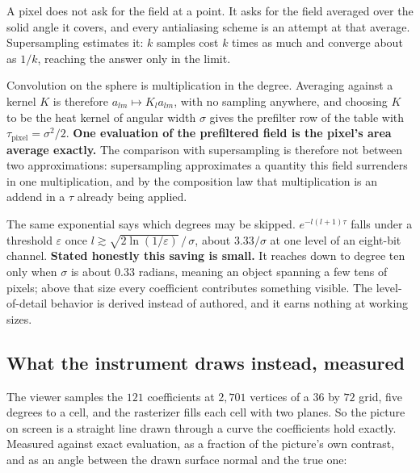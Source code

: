 A pixel does not ask for the field at a point. It asks for the field averaged over the solid angle it covers, and every antialiasing scheme is an attempt at that average. Supersampling estimates it: \(k\) samples cost \(k\) times as much and converge about as \(1/k\), reaching the answer only in the limit.

Convolution on the sphere is multiplication in the degree. Averaging against a kernel \(K\) is therefore \(a_{lm} \mapsto K_l a_{lm}\), with no sampling anywhere, and choosing \(K\) to be the heat kernel of angular width \(\sigma\) gives the prefilter row of the table with \(\tau_{\mathrm{pixel}} = \sigma^2/2\). \textbf{One evaluation of the prefiltered field is the pixel's area average exactly.} The comparison with supersampling is therefore not between two approximations: supersampling approximates a quantity this field surrenders in one multiplication, and by the composition law that multiplication is an addend in a \(\tau\) already being applied.

The same exponential says which degrees may be skipped. \(e^{-l(l+1)\tau}\) falls under a threshold \(\varepsilon\) once \(l \gtrsim \sqrt{2\ln(1/\varepsilon)}\,/\,\sigma\), about \(3.33/\sigma\) at one level of an eight-bit channel. \textbf{Stated honestly this saving is small.} It reaches down to degree ten only when \(\sigma\) is about \(0.33\) radians, meaning an object spanning a few tens of pixels; above that size every coefficient contributes something visible. The level-of-detail behavior is derived instead of authored, and it earns nothing at working sizes.

\subsection{What the instrument draws instead, measured}

The viewer samples the \(121\) coefficients at \(2{,}701\) vertices of a \(36\) by \(72\) grid, five degrees to a cell, and the rasterizer fills each cell with two planes. So the picture on screen is a straight line drawn through a curve the coefficients hold exactly. Measured against exact evaluation, as a fraction of the picture's own contrast, and as an angle between the drawn surface normal and the true one:

